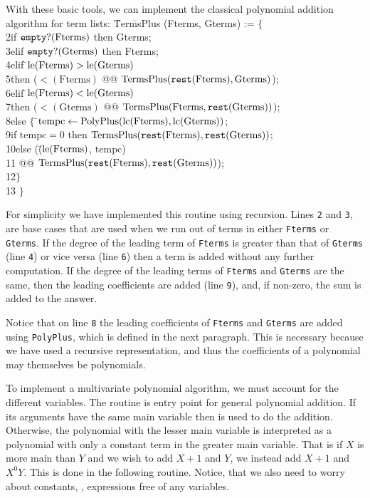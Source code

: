 With these basic tools, we can implement the classical polynomial
addition algorithm for term lists:
\label{TermsPlus:Def}   
 \=Ter\=msPlus (Fterms, Gterms) := $\{$ \\
 2\>\>if $\mathop{\tt empty?}\nolimits(\mbox{Fterms})$ then Gterms; \\
 3\>\>elif $\mathop{\tt empty?}\nolimits(\mbox{Gterms})$ then Fterms; \\
 4\>\>elif \=$\mathop{\rm le}\nolimits(\mbox{Fterms}) > \mathop{\rm le}\nolimits(\mbox{Gterms})$\\
 5\>\>\>then ($\lt(\mbox{Fterms})$ @@ $\mbox{TermsPlus}(\mathop{\tt rest}\nolimits(\mbox{Fterms}), \mbox{Gterms})$);\\
 6\>\>elif \=$\mathop{\rm le}\nolimits(\mbox{Fterms}) < \mathop{\rm le}\nolimits(\mbox{Gterms})$\\
 7\>\>\>then ($\lt(\mbox{Gterms})$ @@ $\mbox{TermsPlus}(\mbox{Fterms}, \mathop{\tt rest}\nolimits(\mbox{Gterms}))$);\\
 8\>\>else $\{$ \=$\mbox{tempc} \leftarrow
\mbox{PolyPlus}(\mathop{\rm lc}\nolimits(\mbox{Fterms}), \mathop{\rm lc}\nolimits(\mbox{Gterms}))$;\\
 9\>\>\>if $\mbox{tempc} = 0$ then $\mbox{TermsPlus}(\mathop{\tt rest}\nolimits(\mbox{Fterms}), \mathop{\tt rest}\nolimits(\mbox{Gterms}))$;\\
10\>\>\>else (\=($\mathop{\rm le}\nolimits(\mbox{Fterms})$, $\mbox{tempc}$)\\
11\>\>\>\> @@ $\mbox{TermsPlus}(\mathop{\tt rest}\nolimits(\mbox{Fterms}), \mathop{\tt rest}\nolimits(\mbox{Gterms}))$);\\
12\>\>\>$\}$\\
13\>\> $\}$
\enddsacode

For simplicity we have implemented this routine using recursion.
Lines {\tt 2} and {\tt 3}, are base cases that are used when we run
out of terms in either {\tt Fterms} or {\tt Gterms}.  If the degree of
the leading term of {\tt Fterms} is greater than that of {\tt Gterms}
(line {\tt 4}) or vice versa (line {\tt 6}) then a term is added
without any further computation.  If the degree of the leading terms
of {\tt Fterms} and {\tt Gterms} are the same, then the leading
coefficients are added (line {\tt 9}), and, if non-zero, the sum is added
to the answer.

Notice that on line {\tt 8} the leading coefficients of {\tt Fterms}
and {\tt Gterms} are added using {\tt PolyPlus}, which is defined in
the next paragraph.  This is necessary because we have used a
recursive representation, and thus the coefficients of a polynomial
may themselves be polynomials.

To implement a multivariate polynomial algorithm, we must account for
the different variables.  The routine  is entry
point for general polynomial addition.  If its arguments have the same
main variable then  is used to do the addition.
Otherwise, the polynomial with the lesser main variable is interpreted
as a polynomial with only a constant term in the greater main
variable.  That is if $X$ is more main than $Y$ and we wish to add
$X+1$ and $Y$, we instead add $X+1$ and $X^0 Y$.  This is done in the
following routine.  Notice, that we also need to worry about
constants, \ie, expressions free of any variables. 

